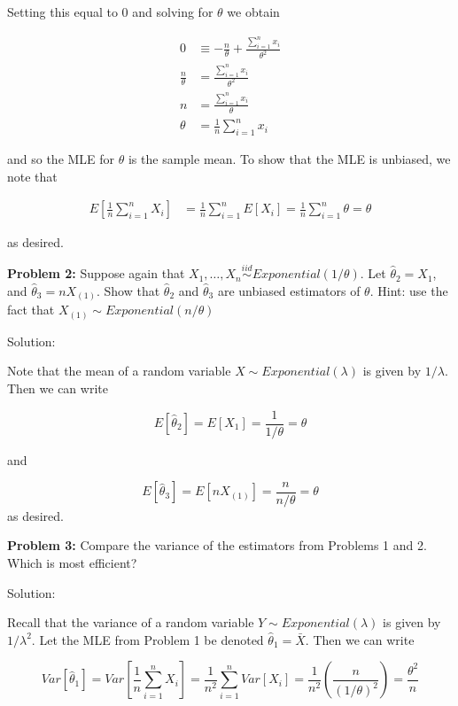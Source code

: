 \documentclass[
  letterpaper,
  DIV=11,
  numbers=noendperiod]{scrreprt}
\begin{document}
Setting this equal to \(0\) and solving for \(\theta\) we obtain

\begin{align*}
    0 & \equiv -\frac{n}{\theta} + \frac{\sum_{i = 1}^n x_i }{\theta^2}  \\
    \frac{n}{\theta} & = \frac{\sum_{i = 1}^n x_i }{\theta^2} \\
    n & = \frac{\sum_{i = 1}^n x_i }{\theta} \\
    \theta & = \frac{1}{n} \sum_{i = 1}^n x_i
\end{align*}

and so the MLE for \(\theta\) is the sample mean. To show that the MLE
is unbiased, we note that

\begin{align*}
    E \left[ \frac{1}{n} \sum_{i = 1}^n X_i \right] & = \frac{1}{n} \sum_{i = 1}^n E[X_i] = \frac{1}{n} \sum_{i = 1}^n \theta  = \theta
\end{align*}

as desired.

\textbf{Problem 2:} Suppose again that
\(X_1, \dots, X_n \overset{iid}{\sim} Exponential(1/\theta)\). Let
\(\hat{\theta}_2 = X_1\), and \(\hat{\theta}_3 = nX_{(1)}\). Show that
\(\hat{\theta}_2\) and \(\hat{\theta}_3\) are unbiased estimators of
\(\theta\). Hint: use the fact that
\(X_{(1)} \sim Exponential(n/\theta)\)

Solution:

Note that the mean of a random variable \(X \sim Exponential(\lambda)\)
is given by \(1/\lambda\). Then we can write

\[
E[\hat{\theta}_2] = E[X_1] = \frac{1}{1/\theta} = \theta
\]

and

\[
E[\hat{\theta}_3] = E[nX_{(1)}] = \frac{n}{n/\theta} = \theta
\] as desired.

\textbf{Problem 3:} Compare the variance of the estimators from Problems
1 and 2. Which is most efficient?

Solution:

Recall that the variance of a random variable
\(Y \sim Exponential(\lambda)\) is given by \(1/\lambda^2\). Let the MLE
from Problem 1 be denoted \(\hat{\theta}_1 = \bar{X}\). Then we can
write

\[
Var\left[\hat{\theta}_1\right] = Var\left[\frac{1}{n} \sum_{i = 1}^n X_i\right] = \frac{1}{n^2} \sum_{i = 1}^n Var[X_i] = \frac{1}{n^2} \left( \frac{n}{(1/\theta)^2} \right) = \frac{\theta^2}{n}
\]
\end{document}
